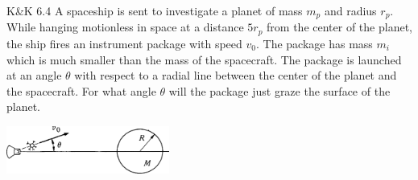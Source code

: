 \documentclass{esg8012pset}
\begin{document}
\begin{problem}{K\&K 6.4}
  A spaceship is sent to investigate a planet of mass $m_p$ and radius $r_p$. While hanging motionless in space at a distance $5 r_p$ from the center of the planet, the ship fires an instrument package with speed $v_0$. The package has mass $m_i$ which is much smaller than the mass of the spacecraft. The package is launched at an angle $\theta$ with respect to a radial line between the center of the planet and the spacecraft. For what angle $\theta$ will the package just graze the surface of the planet.
  \begin{center}\includegraphics[width=0.4\textwidth]{ps08_2}\end{center}
\end{problem}
\end{document}
